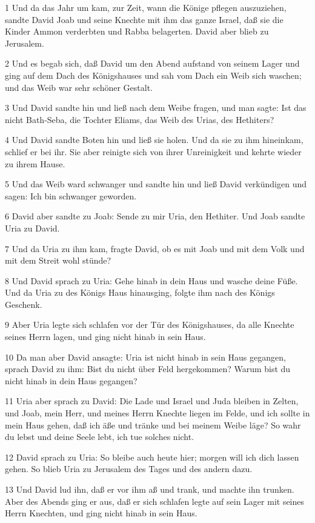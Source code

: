 \par 1 Und da das Jahr um kam, zur Zeit, wann die Könige pflegen auszuziehen, sandte David Joab und seine Knechte mit ihm das ganze Israel, daß sie die Kinder Ammon verderbten und Rabba belagerten. David aber blieb zu Jerusalem.
\par 2 Und es begab sich, daß David um den Abend aufstand von seinem Lager und ging auf dem Dach des Königshauses und sah vom Dach ein Weib sich waschen; und das Weib war sehr schöner Gestalt.
\par 3 Und David sandte hin und ließ nach dem Weibe fragen, und man sagte: Ist das nicht Bath-Seba, die Tochter Eliams, das Weib des Urias, des Hethiters?
\par 4 Und David sandte Boten hin und ließ sie holen. Und da sie zu ihm hineinkam, schlief er bei ihr. Sie aber reinigte sich von ihrer Unreinigkeit und kehrte wieder zu ihrem Hause.
\par 5 Und das Weib ward schwanger und sandte hin und ließ David verkündigen und sagen: Ich bin schwanger geworden.
\par 6 David aber sandte zu Joab: Sende zu mir Uria, den Hethiter. Und Joab sandte Uria zu David.
\par 7 Und da Uria zu ihm kam, fragte David, ob es mit Joab und mit dem Volk und mit dem Streit wohl stünde?
\par 8 Und David sprach zu Uria: Gehe hinab in dein Haus und wasche deine Füße. Und da Uria zu des Königs Haus hinausging, folgte ihm nach des Königs Geschenk.
\par 9 Aber Uria legte sich schlafen vor der Tür des Königshauses, da alle Knechte seines Herrn lagen, und ging nicht hinab in sein Haus.
\par 10 Da man aber David ansagte: Uria ist nicht hinab in sein Haus gegangen, sprach David zu ihm: Bist du nicht über Feld hergekommen? Warum bist du nicht hinab in dein Haus gegangen?
\par 11 Uria aber sprach zu David: Die Lade und Israel und Juda bleiben in Zelten, und Joab, mein Herr, und meines Herrn Knechte liegen im Felde, und ich sollte in mein Haus gehen, daß ich äße und tränke und bei meinem Weibe läge? So wahr du lebst und deine Seele lebt, ich tue solches nicht.
\par 12 David sprach zu Uria: So bleibe auch heute hier; morgen will ich dich lassen gehen. So blieb Uria zu Jerusalem des Tages und des andern dazu.
\par 13 Und David lud ihn, daß er vor ihm aß und trank, und machte ihn trunken. Aber des Abends ging er aus, daß er sich schlafen legte auf sein Lager mit seines Herrn Knechten, und ging nicht hinab in sein Haus.
